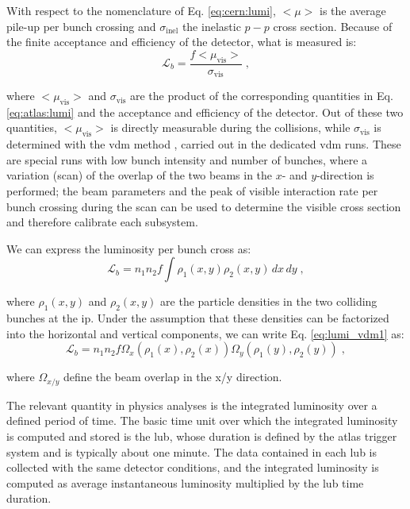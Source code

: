 With respect to the nomenclature of Eq. \ref{eq:cern:lumi}, $<\mu>$ is the average pile-up per bunch crossing and $\sigma_{\mathrm{inel}}$ the inelastic $p-p$ cross section. Because of the finite acceptance and efficiency of the detector, what is measured is:
\begin{equation}
\mathcal{L}_b = \frac{f <\mu_\mathrm{vis}>}{\sigma_{\mathrm{vis}} } \; ,
\end{equation}

where $<\mu_\mathrm{vis}>$ and $\sigma_{\mathrm{vis}}$ are the product of the corresponding quantities in Eq. \ref{eq:atlas:lumi} and the acceptance and efficiency of the detector. Out of these two quantities, $<\mu_\mathrm{vis}>$ is directly measurable during the collisions, while $\sigma_{\mathrm{vis}}$ is determined with the \gls{vdm} method \cite{vanderMeer:296752}, carried out in the dedicated \gls{vdm} runs. These are special runs with low bunch intensity and number of bunches, where a variation (scan) of the overlap of the two beams in the $x$- and $y$-direction is performed; the beam parameters and the peak of visible interaction rate per bunch crossing during the scan can be used to determine the visible cross section and therefore calibrate each subsystem. 

We can express the luminosity per bunch cross as:
\begin{equation}
\mathcal{L}_b = n_1 n_2 f \int \rho_1(x,y) \rho_2(x,y) \, dx \, dy \; ,
\label{eq:lumi_vdm1}
\end{equation}

where $\rho_1(x,y)$ and $\rho_2(x,y)$ are the particle densities in the two colliding bunches at the \gls{ip}. 
Under the assumption that these densities can be factorized into the horizontal and vertical components, we can write Eq. \ref{eq:lumi_vdm1} as:
\begin{equation}
\mathcal{L}_b = n_1 n_2 f  \Omega_x(\rho_1(x), \rho_2(x)) \Omega_y(\rho_1(y), \rho_2(y))  \; ,
\label{eq:lumi_vdm1}
\end{equation}

where $\Omega_{x/y}$ define the beam overlap in the x/y direction.

The relevant quantity in physics analyses is the integrated luminosity over a defined period of time. The basic time unit over which the integrated luminosity is computed and stored is the \gls{lub}, whose duration is defined by the \gls{atlas} trigger system and is typically about one minute. The data contained in each \gls{lub} is collected with the same detector conditions, and the integrated luminosity is computed as average instantaneous luminosity multiplied by the \gls{lub} time duration.

